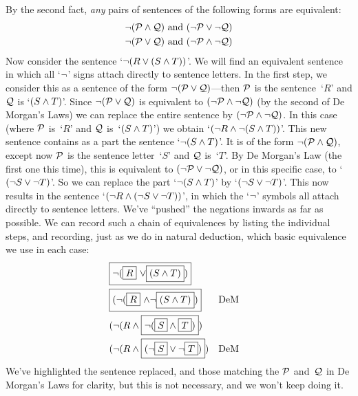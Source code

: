 By the second fact, \emph{any} pairs of sentences of the following forms are equivalent:
\begin{align*}
	\neg (\mathcal{P} \wedge \mathcal{Q}) & \text{ and } (\neg \mathcal{P} \vee \neg \mathcal{Q})\\
	\neg (\mathcal{P} \vee \mathcal{Q}) & \text{ and } (\neg \mathcal{P} \wedge \neg \mathcal{Q})
\end{align*}
Now consider the sentence `$\neg(R \vee (S \wedge T))$'. We will find an equivalent sentence in which all `$\neg$' signs attach directly to sentence letters. In the first step, we consider this as a sentence of the form $\neg(\mathcal{P} \vee \mathcal{Q})$---then $\mathcal{P}$ is the sentence~`$R$' and $\mathcal{Q}$ is `$(S \wedge T)$'. Since $\neg(\mathcal{P} \vee \mathcal{Q})$ is equivalent to $(\neg \mathcal{P} \wedge \neg \mathcal{Q})$ (by the second of De Morgan's Laws) we can replace the entire sentence by $(\neg \mathcal{P} \wedge \neg \mathcal{Q})$. In this case (where $\mathcal{P}$ is~`$R$' and $\mathcal{Q}$ is~`$(S \wedge T)$') we obtain `$(\neg R \wedge \neg (S \wedge T))$'. This new sentence contains as a part the sentence `$\neg (S \wedge T)$'. It is of the form $\neg(\mathcal{P} \wedge \mathcal{Q})$, except now $\mathcal{P}$ is the sentence letter~`$S$' and $\mathcal{Q}$ is~`$T$'. By De Morgan's Law (the first one this time), this is equivalent to $(\neg\mathcal{P} \vee \neg\mathcal{Q})$, or in this specific case, to `$(\neg S \vee \neg T)$'. So we can replace the part `$\neg (S \wedge T)$' by `$(\neg S \vee \neg T)$'. This now results in the sentence `$(\neg R \wedge (\neg S \vee \neg T))$', in which the `$\neg$' symbols all attach directly to sentence letters. We've ``pushed'' the negations inwards as far as possible.  We can record such a chain of equivalences by listing the individual steps, and recording, just as we do in natural deduction, which basic equivalence we use in each case:
\begin{align*}
	& \fbox{\ensuremath{\neg}(\fbox{$R$} \ensuremath{\vee}\fbox{$(S \wedge T)$})} \\
	& \fbox{(\ensuremath{\neg}(\fbox{$R$} \ensuremath{\wedge}\ensuremath{\neg}\fbox{$(S \wedge T)$})} && \text{DeM}\\
	& (\neg(R \wedge \fbox{$\neg(\fbox{$S$} \wedge \fbox{$T$})$}) \\
	& (\neg(R \wedge \fbox{$(\neg \fbox{$S$} \vee \neg \fbox{$T$})$}) && \text{DeM}
\end{align*}
We've highlighted the sentence replaced, and those matching the $\mathcal{P}$ and~$\mathcal{Q}$ in De Morgan's Laws for clarity, but this is not necessary, and we won't keep doing it.

